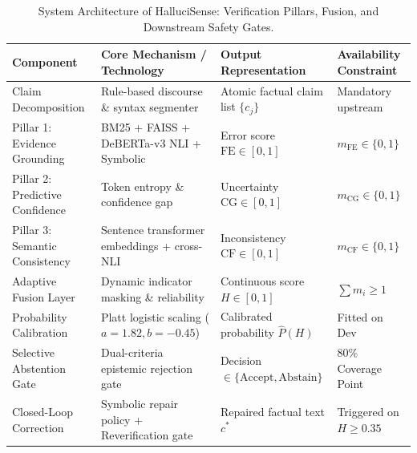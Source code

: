 \begin{table}[t]
\centering
\small
\caption{System Architecture of HalluciSense: Verification Pillars, Fusion, and Downstream Safety Gates.}
\label{tab:system_architecture}
\begin{tabular}{llll}
\toprule
\textbf{Component} & \textbf{Core Mechanism / Technology} & \textbf{Output Representation} & \textbf{Availability Constraint} \\
\midrule
Claim Decomposition & Rule-based discourse \& syntax segmenter & Atomic factual claim list $\{c_j\}$ & Mandatory upstream \\
Pillar 1: Evidence Grounding & BM25 + FAISS + DeBERTa-v3 NLI + Symbolic & Error score $\text{FE} \in [0, 1]$ & $m_{\text{FE}} \in \{0, 1\}$ \\
Pillar 2: Predictive Confidence & Token entropy \& confidence gap & Uncertainty $\text{CG} \in [0, 1]$ & $m_{\text{CG}} \in \{0, 1\}$ \\
Pillar 3: Semantic Consistency & Sentence transformer embeddings + cross-NLI & Inconsistency $\text{CF} \in [0, 1]$ & $m_{\text{CF}} \in \{0, 1\}$ \\
Adaptive Fusion Layer & Dynamic indicator masking \& reliability & Continuous score $H \in [0, 1]$ & $\sum m_i \ge 1$ \\
Probability Calibration & Platt logistic scaling ($a=1.82, b=-0.45$) & Calibrated probability $\hat{P}(H)$ & Fitted on Dev \\
Selective Abstention Gate & Dual-criteria epistemic rejection gate & Decision $\in \{\text{Accept}, \text{Abstain}\}$ & 80\% Coverage Point \\
Closed-Loop Correction & Symbolic repair policy + Reverification gate & Repaired factual text $c^*$ & Triggered on $H \ge 0.35$ \\
\bottomrule
\end{tabular}
\end{table}

